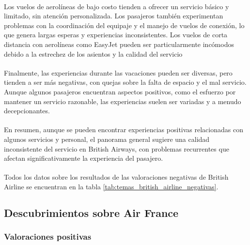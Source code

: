 \documentclass{report}
\begin{document}
{{                    \paragraph*{}{
                        Los vuelos de aerolíneas de bajo costo tienden a ofrecer un servicio básico y limitado, sin atención personalizada. Los pasajeros también experimentan problemas con la coordinación del equipaje y el manejo de vuelos de conexión, lo que genera largas esperas y experiencias inconsistentes. Los vuelos de corta distancia con aerolíneas como EasyJet pueden ser particularmente incómodos debido a la estrechez de los asientos y la calidad del servicio
                    }
                    \paragraph*{}{
                        Finalmente, las experiencias durante las vacaciones pueden ser diversas, pero tienden a ser más negativas, con quejas sobre la falta de espacio y el mal servicio. Aunque algunos pasajeros encuentran aspectos positivos, como el esfuerzo por mantener un servicio razonable, las experiencias suelen ser variadas y a menudo decepcionantes.
                    }
                    \paragraph*{}{
                        En resumen, aunque se pueden encontrar experiencias positivas relacionadas con algunos servicios y personal, el panorama general sugiere una calidad inconsistente del servicio en British Airways, con problemas recurrentes que afectan significativamente la experiencia del pasajero.
                    }
                    \paragraph*{}{
                        Todos los datos sobre los resultados de las valoraciones negativas de British Airline se encuentran en la tabla \ref{tab:temas_british_airline_negativas}.
                    }
            \clearpage\subsection{Descubrimientos sobre Air France}
                \subsubsection*{Valoraciones positivas}
}}
\end{document}
